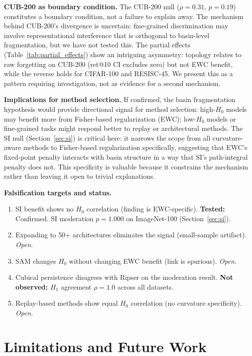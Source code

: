\documentclass{article}
\begin{document}
\textbf{CUB-200 as boundary condition.} The CUB-200 null ($\rho = 0.31$, $p = 0.19$) constitutes a boundary condition, not a failure to explain away. The mechanism behind CUB-200's divergence is uncertain: fine-grained discrimination may involve representational interference that is orthogonal to basin-level fragmentation, but we have not tested this. The partial effects (Table~\ref{tab:partial_effects}) show an intriguing asymmetry: topology relates to raw forgetting on CUB-200 (ret@10 CI excludes zero) but not EWC benefit, while the reverse holds for CIFAR-100 and RESISC-45. We present this as a pattern requiring investigation, not as evidence for a second mechanism.

\textbf{Implications for method selection.} If confirmed, the basin fragmentation hypothesis would provide directional signal for method selection: high-$H_0$ models may benefit more from Fisher-based regularization (EWC); low-$H_0$ models or fine-grained tasks might respond better to replay or architectural methods. The SI null (Section~\ref{sec:si}) is critical here: it narrows the scope from all curvature-aware methods to Fisher-based regularization specifically, suggesting that EWC's fixed-point penalty interacts with basin structure in a way that SI's path-integral penalty does not. This specificity is valuable because it constrains the mechanism rather than leaving it open to trivial explanations.

\textbf{Falsification targets and status.}
\begin{enumerate}[nosep,leftmargin=*]
    \item SI benefit shows no $H_0$ correlation (finding is EWC-specific). \textbf{Tested:} Confirmed. SI moderation $p = 1.000$ on ImageNet-100 (Section~\ref{sec:si}).
    \item Expanding to 50+ architectures eliminates the signal (small-sample artifact). \textit{Open.}
    \item SAM changes $H_0$ without changing EWC benefit (link is spurious). \textit{Open.}
    \item Cubical persistence disagrees with Ripser on the moderation result. \textbf{Not observed:} $H_1$ agreement $\rho = 1.0$ across all datasets.
    \item Replay-based methods show equal $H_0$ correlation (no curvature specificity). \textit{Open.}
\end{enumerate}

\section{Limitations and Future Work}
\label{sec:limitations}
\end{document}
